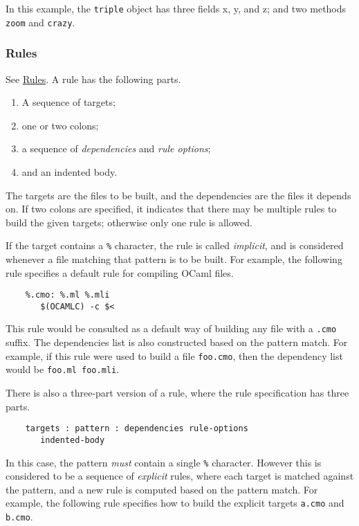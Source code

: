 In this example, the \verb+triple+ object has three fields x, y, and z; and two methods \verb+zoom+
and \verb+crazy+.

\subsubsection{Rules}

See \href{omake-rules.html#rules}{Rules}.  A rule has the following parts.
\begin{enumerate}
\item A sequence of targets;
\item one or two colons;
\item a sequence of \emph{dependencies} and \emph{rule options};
\item and an indented body.
\end{enumerate}

The targets are the files to be built, and the dependencies are the files it depends on.  If two
colons are specified, it indicates that there may be multiple rules to build the given targets;
otherwise only one rule is allowed.

If the target contains a \verb+%+ character, the rule is called \emph{implicit}, and is considered
whenever a file matching that pattern is to be built.  For example, the following rule specifies a
default rule for compiling OCaml files.

\begin{verbatim}
    %.cmo: %.ml %.mli
       $(OCAMLC) -c $<
\end{verbatim}

This rule would be consulted as a default way of building any file with a \verb+.cmo+ suffix.  The
dependencies list is also constructed based on the pattern match.  For example, if this rule were
used to build a file \verb+foo.cmo+, then the dependency list would be \verb+foo.ml foo.mli+.

There is also a three-part version of a rule, where the rule specification has three parts.

\begin{verbatim}
    targets : pattern : dependencies rule-options
       indented-body
\end{verbatim}

In this case, the pattern \emph{must} contain a single \verb+%+ character.  However this is
considered to be a sequence of \emph{explicit} rules, where each target is matched against the
pattern, and a new rule is computed based on the pattern match.  For example, the following rule
specifies how to build the explicit targets \verb+a.cmo+ and \verb+b.cmo+.

